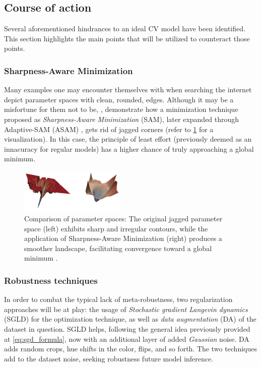 \documentclass[conference]{IEEEtran}
\begin{document}
\subsection{Course of action}

Several aforementioned hindrances to an ideal CV model have been identified. This section highlights the main points that will be utilized to counteract those points. 

\subsubsection{Sharpness-Aware Minimization}
Many examples one may encounter themselves with when searching the internet depict parameter spaces with clean, rounded, edges. Although it may be a misfortune for them not to be, \cite{sam2020}, demonstrate how a minimization technique proposed as \textit{Sharpness-Aware Minimization} (SAM), later expanded through Adaptive-SAM (ASAM) \cite{asam2021}, gets rid of jagged corners (refer to \cref{fig:sam} for a visualization). In this case, the principle of least effort (previously deemed as an innacuracy for regular models) has a higher chance of truly approaching a global minimum.

\begin{figure}[htbp]
    \centering
    \includegraphics[width=0.45\textwidth]{images/sam.png}
    \caption{Comparison of parameter spaces: The original jagged parameter space (left) exhibits sharp and irregular contours, while the application of Sharpness-Aware Minimization (right) produces a smoother landscape, facilitating convergence toward a global minimum \cite{sam2020}.}
\label{fig:sam}
\end{figure}

\subsubsection{Robustness techniques}
In order to combat the typical lack of meta-robustness, two regularization approaches will be at play: the usage of \textit{Stochastic gradient Langevin dynamics} (SGLD) for the optimization technique, as well as \textit{data augmentation} (DA) of the dataset in question. SGLD helps, following the general idea previously provided at \eqref{eq:sgd_formula}, now with an additional layer of added \textit{Gaussian} noise. DA adds random crops, hue shifts in the color, flips, and so forth. The two techniques add to the dataset noise, seeking robustness future model inference. 
\end{document}

